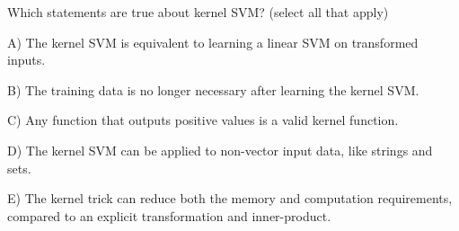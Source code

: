 Which statements are true about kernel SVM? (select all that apply)


A) The kernel SVM is equivalent to learning a linear SVM on transformed inputs.


B) The training data is no longer necessary after learning the kernel SVM.


C) Any function that outputs positive values is a valid kernel function.


D) The kernel SVM can be applied to non-vector input data, like strings and sets.


E) The kernel trick can reduce both the memory and computation requirements, compared to an explicit transformation and inner-product.
